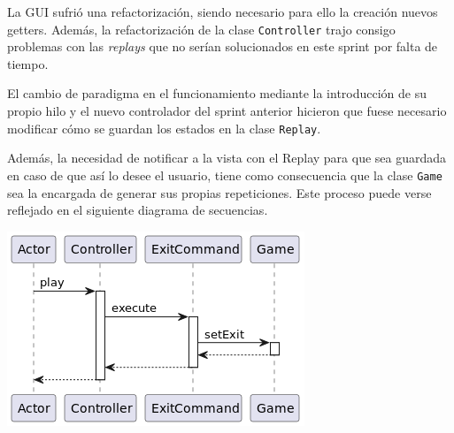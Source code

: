 \documentclass[../DocumentoOficial.tex]{subfiles}
\begin{document}
\begin{sprint}[5]
La GUI sufrió una refactorización, siendo necesario para ello la creación nuevos getters. Además, la refactorización  de la clase \texttt{Controller} trajo consigo problemas con las \textit{replays} que no serían solucionados en este sprint por falta de tiempo.
\end{sprint}

\begin{sprint}[6]
El cambio de paradigma en el funcionamiento mediante la introducción de su propio hilo y el nuevo controlador del sprint anterior hicieron que fuese necesario modificar cómo se guardan los estados en la clase \texttt{Replay}.

Además, la necesidad de notificar a la vista con el Replay para que sea guardada en caso de que así lo desee el usuario, tiene como consecuencia que la clase \texttt{Game} sea la encargada de generar sus propias repeticiones. Este proceso puede verse reflejado en el siguiente diagrama de secuencias.
\begin{center}
\includegraphics[scale=0.5]{addState-replay-sprint-6.png}
\end{center}

\end{sprint}
\end{document}

